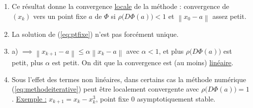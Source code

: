 \documentclass[a4paper,11pt]{article}
\newcommand{\norm}[1]{\left\lVert#1\right\rVert}
\theoremstyle{plain} %
\begin{document}
\begin{remark}
    \begin{enumerate}[-]
        \item Ce résultat donne la convergence \underline{locale} de la méthode :
              convergence de  $(x_k)$ vers un point fixe $a$ de $\Phi$ si
              $\rho \big(D\Phi(a) \big)<1$ et $\norm{x_0-a}$ assez petit.
        \item La solution de (\ref{eq:ptfixe}) n'est pas forcément unique.
        \item a) $\implies \norm{x_{k+1}-a} \leq \alpha \norm{x_k-a}$ avec
              $\alpha < 1$, et plus $\rho \big( D\Phi(a) \big)$ est petit, plus
              $\alpha$ est petit. On dit que la convergence est (au moins)
              \underline{linéaire}.
        \item Sous l'effet des termes non linéaires, dans certains cas la méthode
            numérique (\ref{eq:methodeiterative}) peut être localement convergente
            avec $\rho \big( D\Phi(a) \big) = 1$. \underline{Exemple :} $x_{k+1} = x_k - x_k^3$, point fixe 0 asymptotiquement stable.
    \end{enumerate}
\end{remark}
\end{document}

